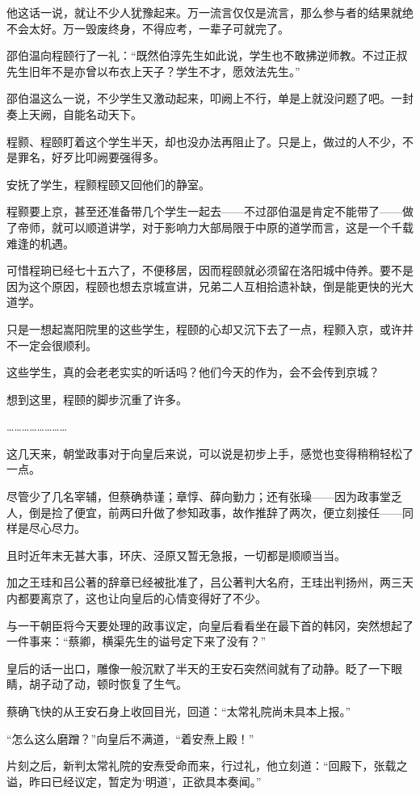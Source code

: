 他这话一说，就让不少人犹豫起来。万一流言仅仅是流言，那么参与者的结果就绝不会太好。万一毁废终身，不得应考，一辈子可就完了。

邵伯温向程颐行了一礼：“既然伯淳先生如此说，学生也不敢拂逆师教。不过正叔先生旧年不是亦曾以布衣上天子？学生不才，愿效法先生。”

邵伯温这么一说，不少学生又激动起来，叩阙上不行，单是上就没问题了吧。一封奏上天阙，自能名动天下。

程颢、程颐盯着这个学生半天，却也没办法再阻止了。只是上，做过的人不少，不是罪名，好歹比叩阙要强得多。

安抚了学生，程颢程颐又回他们的静室。

程颢要上京，甚至还准备带几个学生一起去——不过邵伯温是肯定不能带了——做了帝师，就可以顺道讲学，对于影响力大部局限于中原的道学而言，这是一个千载难逢的机遇。

可惜程珦已经七十五六了，不便移居，因而程颐就必须留在洛阳城中侍养。要不是因为这个原因，程颐也想去京城宣讲，兄弟二人互相拾遗补缺，倒是能更快的光大道学。

只是一想起嵩阳院里的这些学生，程颐的心却又沉下去了一点，程颢入京，或许并不一定会很顺利。

这些学生，真的会老老实实的听话吗？他们今天的作为，会不会传到京城？

想到这里，程颐的脚步沉重了许多。

……………………

这几天来，朝堂政事对于向皇后来说，可以说是初步上手，感觉也变得稍稍轻松了一点。

尽管少了几名宰辅，但蔡确恭谨；章惇、薛向勤力；还有张璪——因为政事堂乏人，倒是捡了便宜，前两曰升做了参知政事，故作推辞了两次，便立刻接任——同样是尽心尽力。

且时近年末无甚大事，环庆、泾原又暂无急报，一切都是顺顺当当。

加之王珪和吕公著的辞章已经被批准了，吕公著判大名府，王珪出判扬州，两三天内都要离京了，这也让向皇后的心情变得好了不少。

与一干朝臣将今天要处理的政事议定，向皇后看看坐在最下首的韩冈，突然想起了一件事来：“蔡卿，横渠先生的谥号定下来了没有？”

皇后的话一出口，雕像一般沉默了半天的王安石突然间就有了动静。眨了一下眼睛，胡子动了动，顿时恢复了生气。

蔡确飞快的从王安石身上收回目光，回道：“太常礼院尚未具本上报。”

“怎么这么磨蹭？”向皇后不满道，“着安焘上殿！”

片刻之后，新判太常礼院的安焘受命而来，行过礼，他立刻道：“回殿下，张载之谥，昨曰已经议定，暂定为‘明道’，正欲具本奏闻。”


